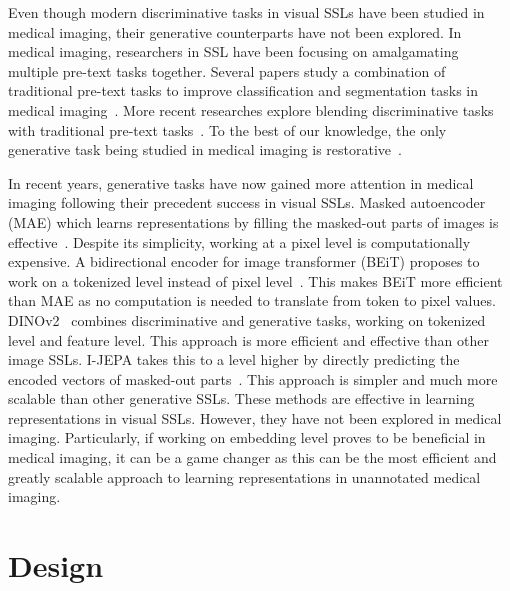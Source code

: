 \documentclass[a4paper,11pt,oneside]{report}
\begin{document}
Even though modern discriminative tasks in visual SSLs have been studied in medical imaging, their generative counterparts have not been explored. In medical imaging, researchers in SSL have been focusing on amalgamating multiple pre-text tasks together. Several papers study a combination of traditional pre-text tasks to improve classification and segmentation tasks in medical imaging~\cite{Noroozi2016, Zhuang2019}. More recent researches explore blending discriminative tasks with traditional pre-text tasks~\cite{Zhou2021, Zhang2021, Dufumier2021, Taleb2020, Zhang2021, He2022Intra, Ren2022}. To the best of our knowledge, the only generative task being studied in medical imaging is restorative~\cite{Pathak2016, Chen2019, Zhou2021, Tang2022, Haghighi2021, Haghighi2024}.

In recent years, generative tasks have now gained more attention in medical imaging following their precedent success in visual SSLs. Masked autoencoder (MAE) which learns representations by filling the masked-out parts of images is effective~\cite{He2022}. Despite its simplicity, working at a pixel level is computationally expensive. A bidirectional encoder for image transformer (BEiT) proposes to work on a tokenized level instead of pixel level~\cite{Bao2022beit}. This makes BEiT more efficient than MAE as no computation is needed to translate from token to pixel values. DINOv2~\cite{Oquab2024dinov} combines discriminative and generative tasks, working on tokenized level and feature level. This approach is more efficient and effective than other image SSLs. I-JEPA takes this to a level higher by directly predicting the encoded vectors of masked-out parts~\cite{Assran2023}. This approach is simpler and much more scalable than other generative SSLs. These methods are effective in learning representations in visual SSLs. However, they have not been explored in medical imaging. Particularly, if working on embedding level proves to be beneficial in medical imaging, it can be a game changer as this can be the most efficient and greatly scalable approach to learning representations in unannotated medical imaging.


\chapter{Design}

\end{document}
